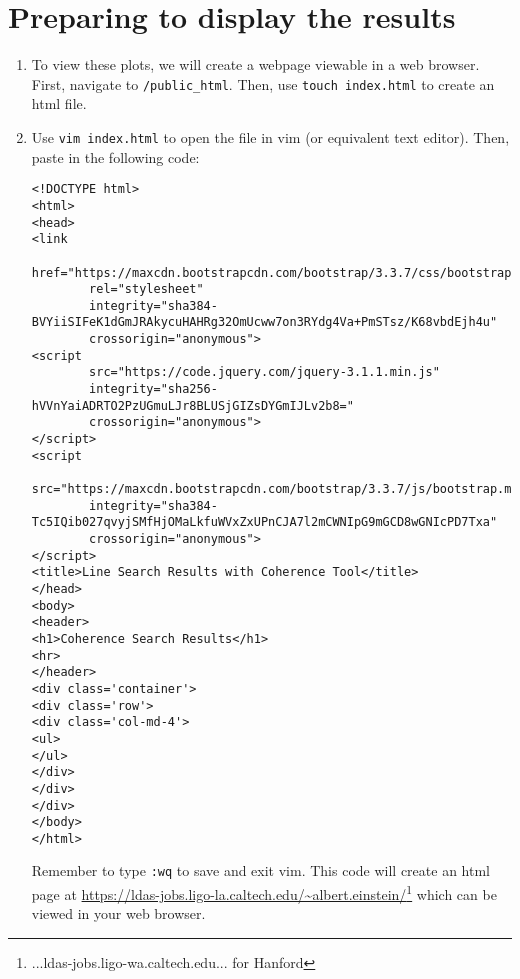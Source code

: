 \documentclass[11pt]{article}
\begin{document}
\section*{Preparing to display the results}
\begin{enumerate}
	\item To view these plots, we will create a webpage viewable in a web browser. First, navigate to {\tt /public\_html}. Then, use {\tt touch index.html} to create an html file.
    \item Use {\tt vim index.html} to open the file in vim (or equivalent text editor). Then, paste in the following code:
	\begin{lstlisting}
<!DOCTYPE html>
<html>
<head>
<link 
        href="https://maxcdn.bootstrapcdn.com/bootstrap/3.3.7/css/bootstrap.min.css" 
        rel="stylesheet" 
        integrity="sha384-BVYiiSIFeK1dGmJRAkycuHAHRg32OmUcww7on3RYdg4Va+PmSTsz/K68vbdEjh4u" 
        crossorigin="anonymous">
<script
        src="https://code.jquery.com/jquery-3.1.1.min.js"
        integrity="sha256-hVVnYaiADRTO2PzUGmuLJr8BLUSjGIZsDYGmIJLv2b8="
        crossorigin="anonymous">
</script>
<script 
        src="https://maxcdn.bootstrapcdn.com/bootstrap/3.3.7/js/bootstrap.min.js" 
        integrity="sha384-Tc5IQib027qvyjSMfHjOMaLkfuWVxZxUPnCJA7l2mCWNIpG9mGCD8wGNIcPD7Txa"
        crossorigin="anonymous">
</script>
<title>Line Search Results with Coherence Tool</title>
</head>
<body>
<header>
<h1>Coherence Search Results</h1>
<hr>
</header>
<div class='container'>
<div class='row'>
<div class='col-md-4'>
<ul>
</ul>
</div>
</div>
</div>
</body>
</html>
	\end{lstlisting}
Remember to type {\tt :wq} to save and exit vim. This code will create an html page at \url{https://ldas-jobs.ligo-la.caltech.edu/~albert.einstein/}\footnote{...ldas-jobs.ligo-wa.caltech.edu... for Hanford} which can be viewed in your web browser.
\end{enumerate}
\end{document}
